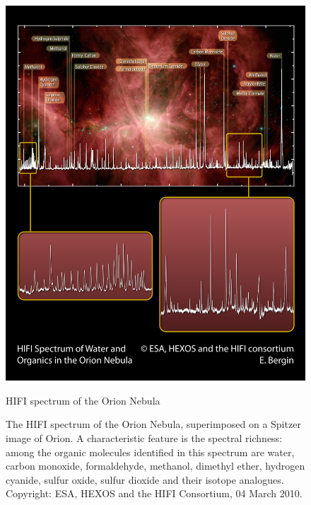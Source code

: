 \begin{figure}[hbtp]
    \centering
    \includegraphics[width=\textwidth]{NHSC_Orion_blowouts_FINAL}
    \caption{HIFI spectrum of the Orion Nebula}
    \caption*{
        The HIFI spectrum of the Orion Nebula,
        superimposed on a Spitzer image of Orion.
        A characteristic feature is the spectral richness: among the organic molecules identified in this spectrum are water, carbon monoxide, formaldehyde, methanol, dimethyl ether, hydrogen cyanide, sulfur oxide, sulfur dioxide and their isotope analogues.
       Copyright: ESA, HEXOS and the HIFI Consortium, 04 March 2010.
    }
    \label{fig:NHSC_Orion_blowouts_FINAL}
\end{figure}

